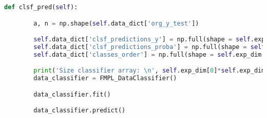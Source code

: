 \begin{lstlisting}[language=Python, numbers=none]
    def clsf_pred(self):

        a, n = np.shape(self.data_dict['org_y_test'])

        self.data_dict['clsf_predictions_y'] = np.full(shape = self.exp_dim + (n,), fill_value = np.nan)
        self.data_dict['clsf_predictions_proba'] = np.full(shape = self.exp_dim + (n, 2), fill_value = np.nan)
        self.data_dict['classes_order'] = np.full(shape = self.exp_dim + (2,), fill_value = np.nan)

        print('Size classifier array: \n', self.exp_dim[0]*self.exp_dim[1]*self.exp_dim[2]*n*2)
        data_classifier = FMPL_DataClassifier()

        data_classifier.fit()

        data_classifier.predict()

\end{lstlisting}

